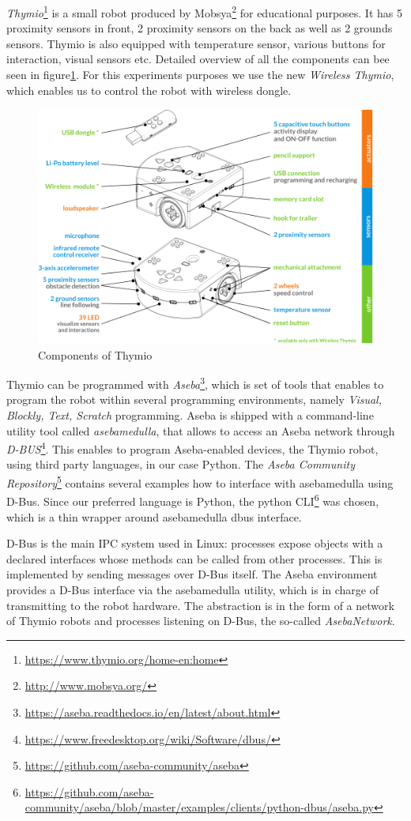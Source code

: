 \documentclass[format=acmsmall, review=false, screen=true]{acmart}
\begin{document}
\emph{Thymio}\footnote{\url{https://www.thymio.org/home-en:home}} is a small robot produced by Mobsya\footnote{\url{http://www.mobsya.org/}} for educational purposes. It has 5 proximity sensors in front, 2 proximity sensors on the back as well as 2 grounds sensors. Thymio is also equipped with temperature sensor, various buttons for interaction, visual sensors etc. Detailed overview of all the components can bee seen in figure\ref{fig:thymio}. For this experiments purposes we use the new \emph{Wireless Thymio}, which enables us to control the robot with wireless dongle.

\begin{figure}[H]
  \includegraphics[width=0.6\linewidth]{img/thymio.PNG}
  \caption{\label{fig:thymio}Components of Thymio}
\end{figure}

Thymio can be programmed with \emph{Aseba}\footnote{\url{https://aseba.readthedocs.io/en/latest/about.html}}, which is set of tools that enables to program the robot within several programming environments, namely \emph{Visual, Blockly, Text, Scratch} programming. Aseba is shipped with a command-line utility tool called \emph{asebamedulla}, that allows to access an Aseba network through \emph{D-BUS}\footnote{\url{https://www.freedesktop.org/wiki/Software/dbus/}}. This enables to program Aseba-enabled devices, the Thymio robot, using third party languages, in our case Python. The \emph{Aseba Community Repository}\footnote{\url{https://github.com/aseba-community/aseba}} contains several examples how to interface with asebamedulla using D-Bus. Since our preferred language is Python, the python CLI\footnote{\url{https://github.com/aseba-community/aseba/blob/master/examples/clients/python-dbus/aseba.py}} was chosen, which is a thin wrapper around asebamedulla dbus interface. 

D-Bus is the main IPC system used in Linux: processes expose objects with a declared interfaces whose methods can be called from other processes. This is implemented by sending messages over D-Bus itself. The Aseba environment provides a D-Bus interface via the asebamedulla utility, which is in charge of transmitting to the robot hardware. The abstraction is in the form of a network of Thymio robots and processes listening on D-Bus, the so-called \emph{AsebaNetwork}. 
\end{document}
